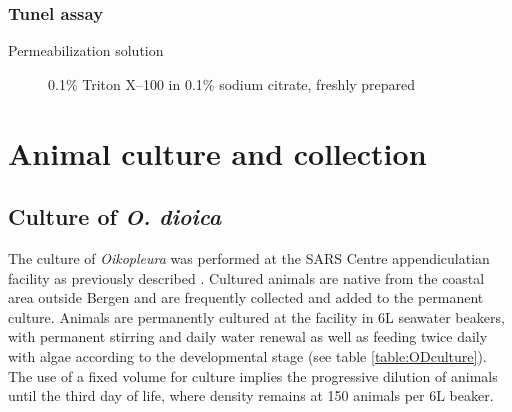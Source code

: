 \documentclass[11pt,twoside,a4paper]{report}
\begin{document}
			\subsubsection{Tunel assay}
			     \begin{description}
					\item[Permeabilization solution] 0.1\% Triton X–100 in 0.1\% sodium citrate, freshly prepared
				\end{description}
		    		    
		    
	\section{Animal culture and collection}
		\subsection{Culture of \textit{O. dioica}}
		The culture of \textit{Oikopleura} was performed at the SARS Centre appendiculatian facility as previously described \cite{Bouquet2009}. Cultured animals are native from the coastal area outside Bergen and are frequently collected and added to the permanent culture. Animals are permanently cultured at the facility in 6L seawater beakers, with permanent stirring and daily water renewal as well as feeding twice daily with algae according to the developmental stage (see table \ref{table:ODculture}). The use of a fixed volume for culture implies the progressive dilution of animals until the third day of life, where density remains at 150 animals per 6L beaker.
		
\end{document}
